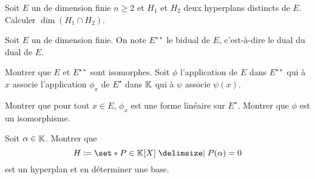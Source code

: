 \documentclass{magnolia}
\begin{document}
Soit $E$ un \Kev de dimension finie $n\geq 2$ et $H_1$ et $H_2$ deux hyperplans
distincts de $E$. Calculer $\dim(H_1 \cap H_2)$.


Soit $E$ un \Kev de dimension finie. On note $E^{\star\star}$ le bidual de $E$,
c'est-à-dire le dual du dual de $E$.
\begin{questions}
\question Montrer que $E$ et $E^{\star\star}$ sont isomorphes.
\question Soit $\phi$ l'application de $E$ dans $E^{\star\star}$ qui à $x$ associe
  l'application $\phi_x$ de $E^\star$ dans $\mathbb{K}$ qui à $\psi$ associe
  $\psi(x)$.
  \begin{questions}
  \question Montrer que pour tout $x\in E$, $\phi_x$ est une forme linéaire
    sur $E^\star$.
  \question Montrer que $\phi$ est un isomorphisme.
  \end{questions}
\end{questions}


Soit $\alpha\in\mathbb{K}$. Montrer que
\[H\defeq\enstq{P\in\polyK}{P(\alpha)=0}\]
est un hyperplan et en déterminer une base.



















\end{document}
